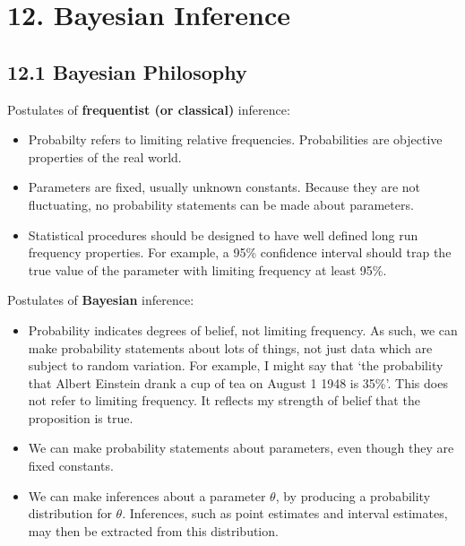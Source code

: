 \section*{12. Bayesian Inference}\label{bayesian-inference}

\subsection*{12.1 Bayesian Philosophy}\label{bayesian-philosophy}
Postulates of \textbf{frequentist (or classical)} inference:
\begin{itemize}[tightlist]
\item
  Probabilty refers to limiting relative frequencies. Probabilities are
  objective properties of the real world.
\item
  Parameters are fixed, usually unknown constants. Because they are not
  fluctuating, no probability statements can be made about parameters.
\item
  Statistical procedures should be designed to have well defined long
  run frequency properties. For example, a 95\% confidence interval
  should trap the true value of the parameter with limiting frequency at
  least 95\%.
\end{itemize}
Postulates of \textbf{Bayesian} inference:
\begin{itemize}[tightlist]
\item
  Probability indicates degrees of belief, not limiting frequency. As
  such, we can make probability statements about lots of things, not
  just data which are subject to random variation. For example, I might
  say that `the probability that Albert Einstein drank a cup of tea on
  August 1 1948 is 35\%'. This does not refer to limiting frequency. It
  reflects my strength of belief that the proposition is true.
\item
  We can make probability statements about parameters, even though they
  are fixed constants.
\item
  We can make inferences about a parameter \(\theta\), by producing a
  probability distribution for \(\theta\). Inferences, such as point
  estimates and interval estimates, may then be extracted from this
  distribution.
\end{itemize}

